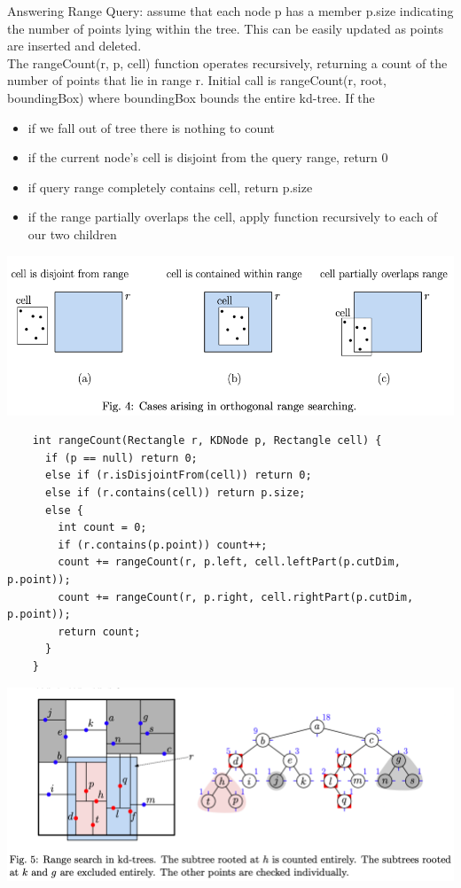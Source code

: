 \documentclass{article}
\begin{document}
  Answering Range Query: assume that each node p has a member p.size indicating the number of points lying within the tree. This can be easily updated as points are inserted and deleted. \\
  The rangeCount(r, p, cell) function operates recursively, returning a count of the number of points that lie in range r. Initial call is rangeCount(r, root, boundingBox) where boundingBox bounds the entire kd-tree. If the 
  \begin{itemize}[noitemsep]
    \item if we fall out of tree there is nothing to count
    \item if the current node's cell is disjoint from the query range, return 0
    \item if query range completely contains cell, return p.size
    \item if the range partially overlaps the cell, apply function recursively to each of our two children
  \end{itemize}
  \includegraphics[width=\textwidth]{RangeCount}
  \newpage
  \begin{lstlisting}
    int rangeCount(Rectangle r, KDNode p, Rectangle cell) {
      if (p == null) return 0;
      else if (r.isDisjointFrom(cell)) return 0;
      else if (r.contains(cell)) return p.size;
      else {
        int count = 0;
        if (r.contains(p.point)) count++;
        count += rangeCount(r, p.left, cell.leftPart(p.cutDim, p.point));
        count += rangeCount(r, p.right, cell.rightPart(p.cutDim, p.point));
        return count;
      }
    }
  \end{lstlisting}
  \includegraphics[width=\textwidth]{RangeSearchExample}
\end{document}
